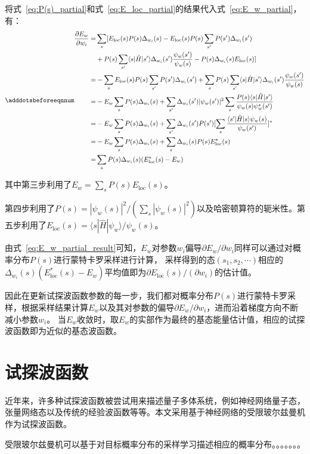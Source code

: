 将式~\eqref{eq:P(s)_partial}和式~\eqref{eq:E_loc_partial}的结果代入式~\eqref{eq:E_w_partial}，有：
\begin{equation} \label{eq:E_w_partial_result}
    \adddotsbeforeeqnnum%
    \begin{split}
        \frac{\partial E_w}{\partial w_i} =& \sum_{s}[E_{\text{loc}}(s)P(s)\Delta_{w_i}(s)-E_{\text{loc}}(s)P(s)\sum_{s^{\prime}}P(s^{\prime})\Delta_{w_i}(s^{\prime})
        \\
        &+P(s)\sum_{s^{\prime}}\langle s|\hat{H}|s^{\prime}\rangle \Delta_{w_i}(s^{\prime})\frac{\psi_{w}(s^{\prime})}{\psi_{w}(s)} - P(s)\Delta_{w_i}(s)E_{\text{loc}}(s)]
        \\
        =& -\sum_{s}E_{\text{loc}}(s)P(s)\sum_{s^{\prime}}P(s^{\prime})\Delta_{w_i}(s^{\prime})+\sum_{s}P(s)\sum_{s^{\prime}}\langle s|\hat{H}|s^{\prime}\rangle \Delta_{w_i}(s^{\prime})\frac{\psi_{w}(s^{\prime})}{\psi_{w}(s)}
        \\
        =& -E_{w}\sum_{s}P(s)\Delta_{w_i}(s)+\sum_{s^{\prime}}\Delta_{w_i}(s^{\prime})|\psi_{w}(s^{\prime})|^{2}\sum_{s}\frac{P(s)\langle s|\hat{H}|s^{\prime}\rangle}{\psi_{w}(s)\psi_{w}^{*}(s^{\prime})}
        \\
        =& -E_{w}\sum_{s}P(s)\Delta_{w_i}(s)+\sum_{s^{\prime}}\Delta_{w_i}(s^{\prime})P(s^{\prime})[\sum_{s}\frac{\langle s^{\prime}|\hat{H}|s\rangle \psi_{w}(s)}{\psi_{w}(s^{\prime})}]^{*}
        \\
        =& -E_{w}\sum_{s}P(s)\Delta_{w_i}(s)+\sum_{s}\Delta_{w_i}(s)P(s)E_{\text{loc}}^{*}(s)
        \\
        =& \sum_{s}P(s)\Delta_{w_i}(s)(E_{\text{loc}}^{*}(s) - E_w)
    \end{split}
\end{equation}

其中第三步利用了$E_w = \sum_{s} P(s)E_{\text{loc}}(s)$。

第四步利用了$P(s)=|\psi_{w}(s)|^{2} /(\sum\limits_{s}|\psi_{w}(s)|^{2})$以及哈密顿算符的轭米性。第五步利用了$E_{\text{loc}}(s)=\langle s|\hat{H}|\psi_{w}\rangle/\psi_{w}(s)$。

由式~\eqref{eq:E_w_partial_result}可知，$E_w$对参数$w_i$偏导$\partial E_{w}/\partial w_{i}$同样可以通过对概率分布$P(s)$进行蒙特卡罗采样进行计算，
采样得到的态$(s_1, s_2, \cdots)$相应的$\Delta_{w_i}(s)(E_{\text{loc}}^{*}(s) - E_w)$平均值即为$\partial E_{\text{loc}}(s)/(\partial w_i)$的估计值。

因此在更新试探波函数参数的每一步，我们都对概率分布$P(s)$进行蒙特卡罗采样，根据采样结果计算$E_w$以及其对参数的偏导$\partial E_{w}/\partial w_{i}$，进而沿着梯度方向不断减小参数$w_i$。
当$E_w$收敛时，取$E_w$的实部作为最终的基态能量估计值，相应的试探波函数即为近似的基态波函数。

\section{试探波函数}
近年来，许多种试探波函数被尝试用来描述量子多体系统，例如神经网络量子态，张量网络态以及传统的经验波函数等等。本文采用基于神经网络的受限玻尔兹曼机作为试探波函数。

受限玻尔兹曼机可以基于对目标概率分布的采样学习描述相应的概率分布。。。。。。。